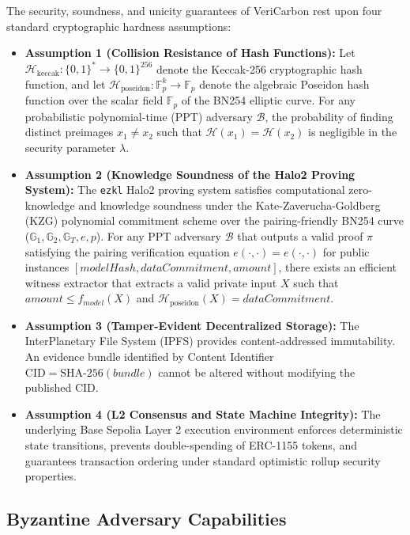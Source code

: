 \documentclass[preprint,12pt]{elsarticle}
\begin{document}
The security, soundness, and unicity guarantees of VeriCarbon rest upon four standard cryptographic hardness assumptions:
\begin{itemize}
\item \textbf{Assumption 1 (Collision Resistance of Hash Functions):} Let $\mathcal{H}_{\text{keccak}}: \{0,1\}^* \rightarrow \{0,1\}^{256}$ denote the Keccak-256 cryptographic hash function, and let $\mathcal{H}_{\text{poseidon}}: \mathbb{F}_p^k \rightarrow \mathbb{F}_p$ denote the algebraic Poseidon hash function over the scalar field $\mathbb{F}_p$ of the BN254 elliptic curve. For any probabilistic polynomial-time (PPT) adversary $\mathcal{B}$, the probability of finding distinct preimages $x_1 \neq x_2$ such that $\mathcal{H}(x_1) = \mathcal{H}(x_2)$ is negligible in the security parameter $\lambda$.
\item \textbf{Assumption 2 (Knowledge Soundness of the Halo2 Proving System):} The \texttt{ezkl} Halo2 proving system satisfies computational zero-knowledge and knowledge soundness under the Kate-Zaverucha-Goldberg (KZG) polynomial commitment scheme \cite{kate2010polynomial,groth2016size} over the pairing-friendly BN254 curve ($\mathbb{G}_1, \mathbb{G}_2, \mathbb{G}_T, e, p$). For any PPT adversary $\mathcal{B}$ that outputs a valid proof $\pi$ satisfying the pairing verification equation $e(\cdot, \cdot) = e(\cdot, \cdot)$ for public instances $[modelHash, dataCommitment, amount]$, there exists an efficient witness extractor that extracts a valid private input $X$ such that $amount \le f_{model}(X)$ and $\mathcal{H}_{\text{poseidon}}(X) = dataCommitment$.
\item \textbf{Assumption 3 (Tamper-Evident Decentralized Storage):} The InterPlanetary File System (IPFS) provides content-addressed immutability. An evidence bundle identified by Content Identifier $\text{CID} = \text{SHA-256}(bundle)$ cannot be altered without modifying the published CID.
\item \textbf{Assumption 4 (L2 Consensus and State Machine Integrity):} The underlying Base Sepolia Layer 2 execution environment enforces deterministic state transitions, prevents double-spending of ERC-1155 tokens, and guarantees transaction ordering under standard optimistic rollup security properties.
\end{itemize}

\subsection{Byzantine Adversary Capabilities}
\end{document}
